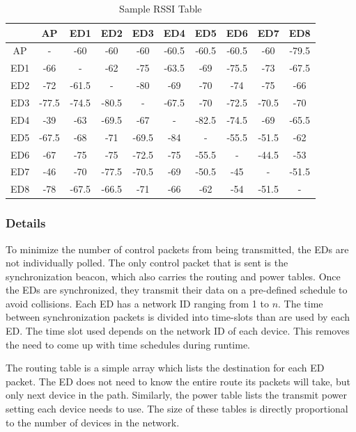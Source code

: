 \documentclass{article}
\begin{document}
\begin{table}[htb]
\begin{center}

\begin{tabular}{|c|c|c|c|c|c|c|c|c|c|}
\hline  & AP & ED1 & ED2 & ED3 & ED4 & ED5 & ED6 & ED7 & ED8 \\ 
\hline AP & - & -60 & -60 & -60 & -60.5 & -60.5 & -60.5 & -60 & -79.5 \\ 
\hline ED1 & -66 & - & -62 & -75 & -63.5 & -69 & -75.5 & -73 & -67.5 \\ 
\hline ED2 & -72 & -61.5 & - & -80 & -69 & -70 & -74 & -75 & -66 \\ 
\hline ED3 & -77.5 & -74.5 & -80.5 & - & -67.5 & -70 & -72.5 & -70.5 & -70 \\ 
\hline ED4 & -39 & -63 & -69.5 & -67 & - & -82.5 & -74.5 & -69 & -65.5 \\ 
\hline ED5 & -67.5 & -68 & -71 & -69.5 & -84 & - & -55.5 & -51.5 & -62 \\ 
\hline ED6 & -67 & -75 & -75 & -72.5 & -75 & -55.5 & - & -44.5 & -53 \\ 
\hline ED7 & -46 & -70 & -77.5 & -70.5 & -69 & -50.5 & -45 & - & -51.5 \\ 
\hline ED8 & -78 & -67.5 & -66.5 & -71 & -66 & -62 & -54 & -51.5 & - \\ 
\hline 
\end{tabular} 
\caption{Sample RSSI Table}
\label{tab:rssi}
\end{center}
\end{table}



\subsubsection{Details}
To minimize the number of control packets from being transmitted, the EDs are not individually polled. The only control packet that is sent is the synchronization beacon, which also carries the routing and power tables. Once the EDs are synchronized, they transmit their data on a pre-defined schedule to avoid collisions. Each ED has a network ID ranging from 1 to $n$. The time between synchronization packets is divided into time-slots than are used by each ED. The time slot used depends on the network ID of each device. This removes the need to come up with time schedules during runtime.

The routing table is a simple array which lists the destination for each ED packet. The ED does not need to know the entire route its packets will take, but only next device in the path. Similarly, the power table lists the transmit power setting each device needs to use. The size of these tables is directly proportional to the number of devices in the network.
\end{document}
